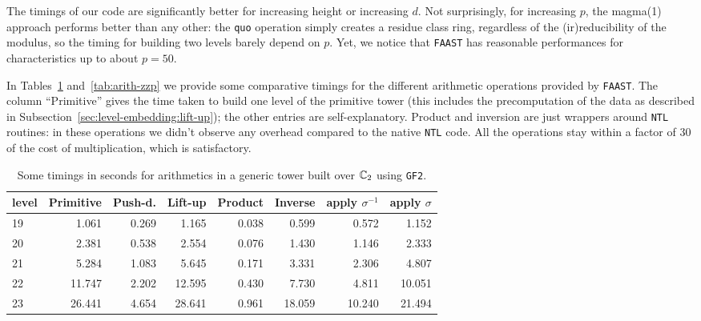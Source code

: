 The timings of our code are significantly better for increasing height
or increasing $d$. Not surprisingly, for increasing $p$, the magma(1)
approach performs better than any other: the {\tt quo} operation
simply creates a residue class ring, regardless of the
(ir)reducibility of the modulus, so the timing for building two levels
barely depend on $p$. Yet, we notice that \texttt{FAAST} has
reasonable performances for characteristics up to about $p=50$.

\smallskip

In Tables~\ref{tab:arith-gf2} and~\ref{tab:arith-zzp} we provide some
comparative timings for the different arithmetic operations provided
by \texttt{FAAST}. The column ``Primitive'' gives the time taken to
build one level of the primitive tower (this includes the
precomputation of the data as described in
Subsection~\ref{sec:level-embedding:lift-up}); the other entries are
self-explanatory. Product and inversion are just wrappers around
\texttt{NTL} routines: in these operations we didn't observe any
overhead compared to the native \texttt{NTL} code. All the operations
stay within a factor of $30$ of the cost of multiplication, which is
satisfactory.

\begin{table}
  \centering
  \begin{tabular}{l | r | r | r | r | r | r | r}
    level & Primitive & Push-d. & Lift-up & Product & Inverse & apply $\sigma^{-1}$ & apply $\sigma$ \\
    \hline
     19 &  1.061 & 0.269 &  1.165 & 0.038 &  0.599 &  0.572 &  1.152\\
     20 &  2.381 & 0.538 &  2.554 & 0.076 &  1.430 &  1.146 &  2.333\\
     21 &  5.284 & 1.083 &  5.645 & 0.171 &  3.331 &  2.306 &  4.807\\
     22 & 11.747 & 2.202 & 12.595 & 0.430 &  7.730 &  4.811 & 10.051\\
     23 & 26.441 & 4.654 & 28.641 & 0.961 & 18.059 & 10.240 & 21.494\\
  \end{tabular}
  \caption{Some timings in seconds for arithmetics in a generic tower built over $\mathbb{C}_2$ using \texttt{GF2}.}
  \label{tab:arith-gf2}
\end{table}

